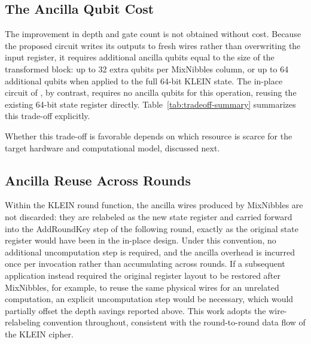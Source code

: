 \subsection{The Ancilla Qubit Cost}

The improvement in depth and gate count is not obtained without cost. Because the proposed circuit writes its outputs to fresh wires rather than overwriting the input register, it requires additional ancilla qubits equal to the size of the transformed block: up to \num{32} extra qubits per MixNibbles column, or up to \num{64} additional qubits when applied to the full 64-bit KLEIN state. The in-place circuit of \cite{cryptoeprint:2026/1007}, by contrast, requires no ancilla qubits for this operation, reusing the existing 64-bit state register directly. Table~\ref{tab:tradeoff-summary} summarizes this trade-off explicitly.

\begin{table}[htbp]
\centering
{}
\caption{Resource trade-off between in-place and out-of-place MixNibbles circuits.}
\label{tab:tradeoff-summary}
\end{table}

Whether this trade-off is favorable depends on which resource is scarce for the target hardware and computational model, discussed next.

\subsection{Ancilla Reuse Across Rounds}

Within the KLEIN round function, the ancilla wires produced by MixNibbles are not discarded: they are relabeled as the new state register and carried forward into the AddRoundKey step of the following round, exactly as the original state register would have been in the in-place design. Under this convention, no additional uncomputation step is required, and the ancilla overhead is incurred once per invocation rather than accumulating across rounds. If a subsequent application instead required the original register layout to be restored after MixNibbles, for example, to reuse the same physical wires for an unrelated computation, an explicit uncomputation step would be necessary, which would partially offset the depth savings reported above. This work adopts the wire-relabeling convention throughout, consistent with the round-to-round data flow of the KLEIN cipher.

